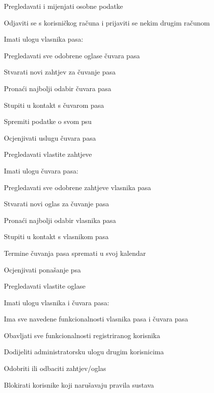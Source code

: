 \begin{packed_enum}
\begin{packed_enum}
					\item Pregledavati i mijenjati osobne podatke
					\item Odjaviti se s korisničkog računa i prijaviti se nekim drugim računom
					\item Imati ulogu vlasnika pasa:
					\begin{packed_enum}
						\item Pregledavati sve odobrene oglase čuvara pasa
						\item Stvarati novi zahtjev za čuvanje pasa
						\item Pronaći najbolji odabir čuvara pasa
						\item Stupiti u kontakt s čuvarom pasa
						\item Spremiti podatke o svom psu
						\item Ocjenjivati uslugu čuvara pasa
						\item Pregledavati vlastite zahtjeve
					\end{packed_enum}
					\item Imati ulogu čuvara pasa:
					\begin{packed_enum}
						\item Pregledavati sve odobrene zahtjeve vlasnika pasa
						\item Stvarati novi oglas za čuvanje pasa
						\item Pronaći najbolji odabir vlasnika pasa
						\item Stupiti u kontakt s vlasnikom pasa
						\item Termine čuvanja pasa spremati u svoj kalendar
						\item Ocjenjivati ponašanje psa
						\item Pregledavati vlastite oglase
					\end{packed_enum}
					\item Imati ulogu vlasnika i čuvara pasa:
					\begin{packed_enum}
						\item Ima sve navedene funkcionalnosti vlasnika pasa i čuvara pasa
					\end{packed_enum}
				\end{packed_enum}
			
				\item {}
				\begin{packed_enum}
					\item Obavljati sve funkcionalnosti registriranog korisnika
					\item Dodijeliti administratorsku ulogu drugim korisnicima
					\item Odobriti ili odbaciti zahtjev/oglas
					\item Blokirati korisnike koji narušavaju pravila sustava
				\end{packed_enum}
			

\end{packed_enum}
